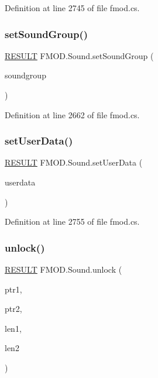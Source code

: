Definition at line 2745 of file fmod.\+cs.

\mbox{\label{class_f_m_o_d_1_1_sound_ac492a2be49984503d3e0f9cbfcc3692c}} 
\subsubsection{\texorpdfstring{set\+Sound\+Group()}{setSoundGroup()}}
{\footnotesize\ttfamily \hyperlink{namespace_f_m_o_d_a305d1176ef3f8c8815861a60407ac33d}{R\+E\+S\+U\+LT} F\+M\+O\+D.\+Sound.\+set\+Sound\+Group (\begin{DoxyParamCaption}\item[{\hyperlink{class_f_m_o_d_1_1_sound_group}{Sound\+Group}}]{soundgroup }\end{DoxyParamCaption})}



Definition at line 2662 of file fmod.\+cs.

\mbox{\label{class_f_m_o_d_1_1_sound_af5e4b9df55aac313898fe00f694a1572}} 
\subsubsection{\texorpdfstring{set\+User\+Data()}{setUserData()}}
{\footnotesize\ttfamily \hyperlink{namespace_f_m_o_d_a305d1176ef3f8c8815861a60407ac33d}{R\+E\+S\+U\+LT} F\+M\+O\+D.\+Sound.\+set\+User\+Data (\begin{DoxyParamCaption}\item[{Int\+Ptr}]{userdata }\end{DoxyParamCaption})}



Definition at line 2755 of file fmod.\+cs.

\mbox{\label{class_f_m_o_d_1_1_sound_a5348c2c882cf50c93bdfcebf027697f8}} 
\subsubsection{\texorpdfstring{unlock()}{unlock()}}
{\footnotesize\ttfamily \hyperlink{namespace_f_m_o_d_a305d1176ef3f8c8815861a60407ac33d}{R\+E\+S\+U\+LT} F\+M\+O\+D.\+Sound.\+unlock (\begin{DoxyParamCaption}\item[{Int\+Ptr}]{ptr1,  }\item[{Int\+Ptr}]{ptr2,  }\item[{uint}]{len1,  }\item[{uint}]{len2 }\end{DoxyParamCaption})}



